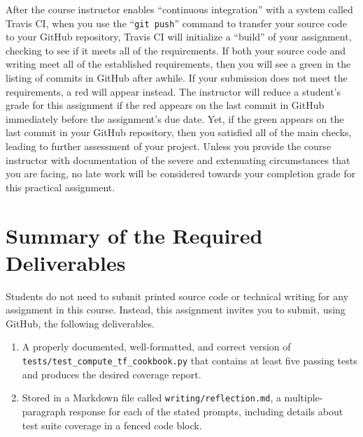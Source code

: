 \documentclass[11pt]{article}
\newcommand{\testprogramsource}{\lstinline{tests/test_compute_tf_cookbook.py}}
\newcommand{\reflection}{\lstinline{writing/reflection.md}}
\newcommand{\gitpush}{\command{git push}}
\newcommand{\command}[1]{``\lstinline{#1}''}
\newcommand{\step}[1]{``{#1}''}
\newcommand{\checkmark}{\ding{51}}
\newcommand{\naughtmark}{\ding{55}}
\begin{document}
After the course instructor enables \step{continuous integration} with a system
called Travis CI, when you use the \gitpush{} command to transfer your source
code to your GitHub repository, Travis CI will initialize a \step{build} of your
assignment, checking to see if it meets all of the requirements. If both your
source code and writing meet all of the established requirements, then you will
see a green \checkmark{} in the listing of commits in GitHub after awhile. If
your submission does not meet the requirements, a red \naughtmark{} will appear
instead. The instructor will reduce a student's grade for this assignment if the
red \naughtmark{} appears on the last commit in GitHub immediately before the
assignment's due date. Yet, if the green \checkmark{} appears on the last commit
in your GitHub repository, then you satisfied all of the main checks, leading to
further assessment of your project. Unless you provide the course instructor
with documentation of the severe and extenuating circumstances that you are
facing, no late work will be considered towards your completion grade for this
practical assignment.

\section*{Summary of the Required Deliverables}

\noindent Students do not need to submit printed source code or technical
writing for any assignment in this course. Instead, this assignment invites you
to submit, using GitHub, the following deliverables.

\vspace*{-.25em}

\begin{enumerate}

\setlength{\itemsep}{0in}

\item A properly documented, well-formatted, and correct version of
  \testprogramsource{} that contains at least five passing tests and produces
  the desired coverage report.

\item Stored in a Markdown file called \reflection{}, a multiple-paragraph
  response for each of the stated prompts, including details about test suite
  coverage in a fenced code block.


\end{enumerate}
\end{document}
